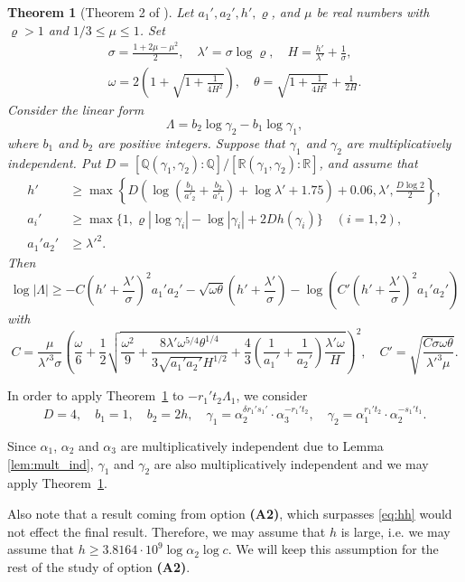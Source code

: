 \documentclass{amsart}
\newtheorem{theorem}{Theorem}
\theoremstyle{definition}
\def\QQ{\mathbb Q}
\def\RR{\mathbb R}
\begin{document}
\begin{theorem}[Theorem 2 of \cite{Laurent:2008}]\label{thm:L1}
Let $a_1',a_2',h',\varrho$, and $\mu$ be real numbers with $\varrho>1$ and $1/3\le \mu \le 1$. Set
\begin{gather*}
\sigma = \frac{1+2\mu-\mu^2}{2},\quad \lambda' = \sigma \log \varrho,\quad H= \frac{h'}{\lambda'} + \frac{1}{\sigma},\\
\omega=2\left(1+\sqrt{1+\frac{1}{4H^2}}\right),\quad \theta = \sqrt{1+\frac{1}{4H^2}}+\frac{1}{2H}.
\end{gather*}
Consider the linear form 
$$
\Lambda = b_2 \log \gamma_2- b_1 \log\gamma_1,
$$
where $b_1$ and $b_2$ are positive integers. Suppose that $\gamma_1$ and $\gamma_2$ are multiplicatively independent.
Put $D=[\QQ(\gamma_1,\gamma_2):\QQ]/[\RR(\gamma_1,\gamma_2):\RR]$, and assume that 
\begin{align*}
h' &\ge\max\left\{D\left(\log\left(\frac{b_1}{a'_2}+\frac{b_2}{a'_1}\right)+\log\lambda' +1.75\right)+0.06,\lambda',\frac{D\log 2}{2}\right\}, \\ 
a_i'&\ge \max\{1,\varrho|\log \gamma_i|-\log|\gamma_i|+2Dh(\gamma_i)\}\quad (i=1,2),\\
a_1'a_2'& \ge {\lambda'}^2.
\end{align*}
Then 
$$
\log|\Lambda| \ge -C\left(h'+\frac{\lambda'}{\sigma}\right)^2a_1'a_2' - 
\sqrt{\omega\theta}\left(h'+\frac{\lambda'}{\sigma}\right)-\log\left(C'\left(h'+\frac{\lambda'}{\sigma}\right)^2a_1'a_2'\right)
$$
with 
$$
C=\frac{\mu}{\lambda'^3\sigma}\left(\frac{\omega}{6}+\frac{1}{2}\sqrt{\frac{\omega^2}{9}+
\frac{8\lambda'\omega^{5/4}\theta^{1/4}}{3\sqrt{a_1'a_2'}H^{1/2}}+\frac{4}{3}\left(\frac{1}{a_1'}+\frac{1}{a_2'}\right)\frac{\lambda'\omega}{H}}\right)^2,
\quad C'=\sqrt{\frac{C\sigma\omega\theta}{\lambda'^3\mu}}.
$$
\end{theorem}

In order to apply Theorem~\ref{thm:L1} to $-r_1't_2\Lambda_1$, we consider 
$$
D=4,\quad b_1 = 1,\quad b_2 =2h,\quad \gamma_1 = \alpha_2^{\delta r_1's_1'} \cdot\alpha_3^{-r_1't_2},
\quad \gamma_2 =  \alpha_1^{r_1't_2}\cdot \alpha_2^{-s_1't_1}. 
$$

Since $\alpha_1$, $\alpha_2$ and $\alpha_3$ are multiplicatively independent due to Lemma \ref{lem:mult_ind}, 
$\gamma_1$ and $\gamma_2$ are also multiplicatively independent and we may apply Theorem~\ref{thm:L1}.

Also note that a result coming from option \textbf{(A2)}, which surpasses \eqref{eq:hh} would not effect the final result.
Therefore, we may assume that $h$ is large, i.e. we may assume that $h\geq 3.8164\cdot 10^{9}\log \alpha_2 \log c$. We will keep
this assumption for the rest of the study of option \textbf{(A2)}.
\end{document}
